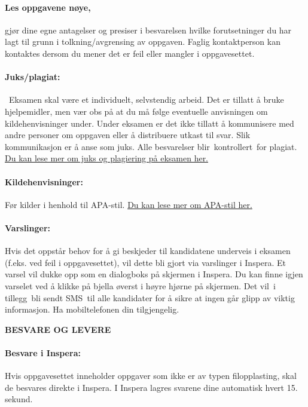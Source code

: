 \documentclass[a4paper,12pt,fleqn]{article}
\begin{document}
\paragraph{\textbf{Les oppgavene nøye,}} gjør dine egne antagelser og presiser i
besvarelsen hvilke forutsetninger du har lagt til grunn i tolkning/avgrensing av
oppgaven. Faglig kontaktperson kan kontaktes dersom du mener det er feil
eller mangler i oppgavesettet. 

\paragraph{\textbf{Juks/plagiat:}} Eksamen skal være et individuelt, selvstendig
arbeid. Det er tillatt å bruke hjelpemidler, men vær obs på at du må følge
eventuelle anvisningen om kildehenvisninger under. Under eksamen er det ikke
tillatt å kommunisere med andre personer om oppgaven eller å distribuere utkast
til svar. Slik kommunikasjon er å anse som juks. Alle besvarelser
blir kontrollert for plagiat.
\href{https://innsida.ntnu.no/wiki/-/wiki/Norsk/Juks+p\%C3\%A5\%20eksamen}{Du
kan lese mer om juks og plagiering på eksamen her.} 

\paragraph{\textbf{Kildehenvisninger:}} Før kilder i henhold til APA-stil.
\href{https://i.ntnu.no/wiki/-/wiki/Norsk/Bruke+referansestilen+APA}{Du kan lese
mer om APA-stil her.}

\paragraph{\textbf{Varslinger:}} Hvis det oppstår behov for å gi beskjeder til
kandidatene underveis i eksamen (f.eks. ved feil i oppgavesettet), vil dette bli
gjort via varslinger i Inspera. Et varsel vil dukke opp som en dialogboks på
skjermen i Inspera. Du kan finne igjen varselet ved å klikke på bjella øverst i
høyre hjørne på skjermen. Det vil i tillegg bli sendt SMS til alle kandidater
for å sikre at ingen går glipp av viktig informasjon. Ha mobiltelefonen din
tilgjengelig.

\begin{center}
	\textbf{BESVARE OG LEVERE}
\end{center}

\paragraph{\textbf{Besvare i Inspera:}} Hvis oppgavesettet inneholder oppgaver
som ikke er av typen filopplasting, skal de besvares direkte i Inspera. I
Inspera lagres svarene dine automatisk hvert 15. sekund.
\end{document}
